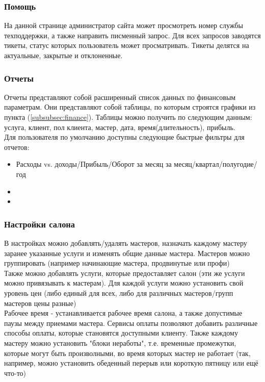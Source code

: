 \documentclass[DIV=calc, paper=a4, fontsize=11pt]{scrartcl} %
\begin{document}
\subsubsection{Помощь}
На данной странице администратор сайта может просмотреть номер службы техподдержки, а также направить писменный запрос. Для всех запросов заводятся тикеты, статус которых пользователь может просматривать. Тикеты делятся на актуальные, закрытые и отклоненные.

\subsubsection{Отчеты}
Отчеты представляют собой расширенный список данных по финансовым параметрам. Они представляют собой таблицы, по которым строятся графики из пункта (\ref{subsubsec:finance}). Таблицы можно получить по следующим данным: услуга, клиент, пол клиента, мастер, дата, время(длительность), прибыль. 
\\[0.5cm]
Для пользователя по умолчанию доступны следующие быстрые фильтры для отчетов: 
    \begin{itemize}
        \item Расходы vs. доходы/Прибыль/Оборот за месяц за месяц/квартал/полугодие/год
        \item 
        \item 
    \end{itemize}


\subsubsection{Настройки салона}
В настройках можно добавлять/удалять мастеров, назначать каждому мастеру заранее указанные услуги и изменять общие данные мастера. Мастеров можно группировать (например начинающие мастера, продвинутые или профи)
\\[0.5cm]
Также можно добавлять услуги, которые предоставляет салон (эти же услуги можно привязывать к мастерам). Для каждой услуги можно установить свой уровень цен (либо единый для всех, либо для различных мастеров/групп мастеров цены разные)
\\[0.5cm]
Рабочее время - устанавливается рабочее время салона, а также допустимые паузы между приемами мастера.
Сервисы оплаты позволяют добавить различные способы оплаты, которые становятся доступными клиенту. Также каждому мастеру можно установить "блоки неработы", т.е. временные промежутки, которые могут быть произволными, во время которых мастер не работает (так, например, можно установить обеденный перерыв или короткую пятницу или ещё что-то)
\end{document}
